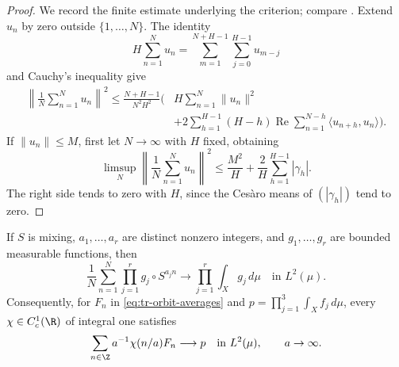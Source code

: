 \begin{proof}
We record the finite estimate underlying the criterion; compare
\cite[Lemma~D.1]{HostKra}.  Extend \(u_n\) by zero outside
\(\{1,\ldots,N\}\).  The identity
\[
 H\sum_{n=1}^Nu_n
 =\sum_{m=1}^{N+H-1}\sum_{j=0}^{H-1}u_{m-j}
\]
and Cauchy's inequality give
\begin{align*}
 \left\|\frac1N\sum_{n=1}^Nu_n\right\|^2
 \leq\frac{N+H-1}{N^2H^2}\bigg(&H\sum_{n=1}^N\|u_n\|^2\\
 &+2\sum_{h=1}^{H-1}(H-h)
      \operatorname{Re}\sum_{n=1}^{N-h}\langle u_{n+h},u_n\rangle
 \bigg).
\end{align*}
If \(\|u_n\|\leq M\), first let \(N\to\infty\) with \(H\)
fixed, obtaining
\[
 \limsup_N\left\|\frac1N\sum_{n=1}^Nu_n\right\|^2
 \leq\frac{M^2}{H}+\frac2H\sum_{h=1}^{H-1}|\gamma_h|.
\]
The right side tends to zero with \(H\), since the Ces\`aro means
of \((|\gamma_h|)\) tend to zero.
\end{proof}

\begin{lemma}
\label{lem:tr-norm}
If \(S\) is mixing, \(a_1,\ldots,a_r\) are distinct nonzero
integers, and \(g_1,\ldots,g_r\) are bounded measurable functions,
then
\begin{equation}
 \frac1N\sum_{n=1}^N\prod_{j=1}^rg_j\circ S^{a_jn}
 \longrightarrow\prod_{j=1}^r\int_Xg_j\,d\mu
 \quad\text{in }L^2(\mu).
 \label{eq:tr-norm}
\end{equation}
Consequently, for \(F_n\) in \eqref{eq:tr-orbit-averages} and
\(p=\prod_{j=1}^3\int_Xf_j\,d\mu\), every
\(\chi\in C_c^1(\R)\) of integral one satisfies
\begin{equation}
 \sum_{n\in\Z}a^{-1}\chi(n/a)F_n\longrightarrow p
 \quad\text{in }L^2(\mu),\qquad a\to\infty.
 \label{eq:tr-weighted-norm}
\end{equation}
\end{lemma}


